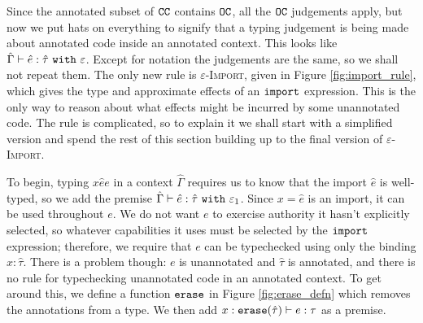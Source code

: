 Since the annotated subset of $\mathtt{CC}$ contains $\mathtt{OC}$, all the $\mathtt{OC}$ judgements apply, but now we put hats on everything to signify that a typing judgement is being made about annotated code inside an annotated context. This looks like $\hat \Gamma \vdash \hat e: \hat \tau~\mathtt{with}~ \varepsilon$. Except for notation the judgements are the same, so we shall not repeat them. The only new rule is \textsc{$\varepsilon$-Import}, given in Figure \ref{fig:import_rule}, which gives the type and approximate effects of an $\mathtt{import}$ expression. This is the only way to reason about what effects might be incurred by some unannotated code. The rule is complicated, so to explain it we shall start with a simplified version and spend the rest of this section building up to the final version of \textsc{$\varepsilon$-Import}.

%
%
% 

To begin, typing ${x}{\hat e}{e}$ in a context $\hat \Gamma$ requires us to know that the import $\hat e$ is well-typed, so we add the premise $\hat \Gamma \vdash \hat e: \hat \tau~\mathtt{with}~ \varepsilon_1$. Since $x = \hat e$ is an import, it can be used throughout $e$. We do not want $e$ to exercise authority it hasn't explicitly selected, so whatever capabilities it uses must be selected by the $\mathtt{import}$ expression; therefore, we require that $e$ can be typechecked using only the binding $x: \hat \tau$. There is a problem though: $e$ is unannotated and $\hat \tau$ is annotated, and there is no rule for typechecking unannotated code in an annotated context. To get around this, we define a function $\mathtt{erase}$ in Figure \ref{fig:erase_defn} which removes the annotations from a type. We then add $x: \mathtt{erase}(\hat \tau) \vdash e: \tau$ as a premise.

